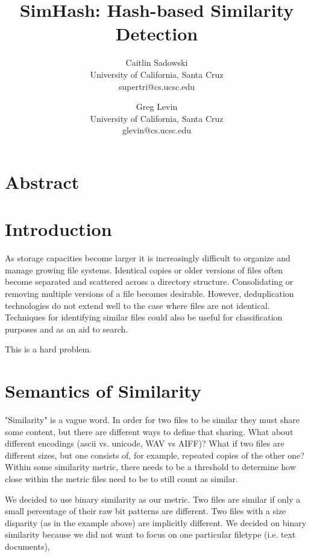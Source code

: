 \documentclass[10pt, twocolumn]{article}
\begin{document}
\title{SimHash: Hash-based Similarity Detection}

\author{Caitlin Sadowski\\
University of California, Santa Cruz\\
supertri@cs.ucsc.edu
\and
Greg Levin\\
University of California, Santa Cruz\\
glevin@cs.ucsc.edu}


\def\copyrightspace{}

\maketitle

\section{Abstract}


\section{Introduction}

As storage capacities become larger it is increasingly difficult to organize and manage growing file systems. Identical copies or older versions of files often become separated and scattered across a directory structure. Consolidating or removing multiple versions of a file becomes desirable. However, deduplication technologies do not extend well to the case where files are not identical. Techniques for identifying similar files could also be useful for classification purposes and as an aid to search.

This is a hard problem.


\section{Semantics of Similarity}
"Similarity" is a vague word. In order for two files to be similar they must share some content, but there are different ways to define that sharing. What about different encodings (ascii vs. unicode, WAV vs AIFF)? What if two files are different sizes, but one consists of, for example, repeated copies of the other one? Within some similarity metric, there needs to be a threshold to determine how close within the metric files need to be to still count as similar. 

We decided to use binary similarity as our metric. Two files are similar if only a small percentage of their raw bit patterns are different. Two files with a size disparity (as in the example above) are implicitly different. We decided on binary similarity because we did not want to focus on one particular filetype (i.e. text documents), 
\end{document}
